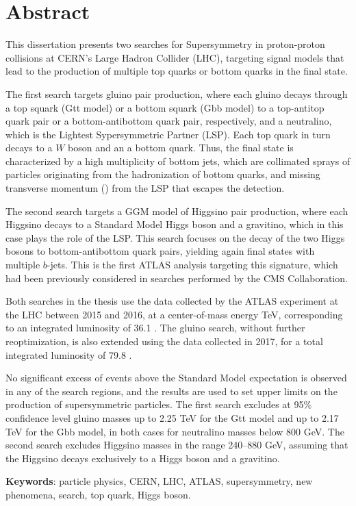 \chapter*{Abstract}

This dissertation presents two searches for Supersymmetry in proton-proton collisions at CERN's Large Hadron Collider (LHC), 
targeting signal models that lead to the production of multiple top quarks or bottom quarks in the final state.

The first search targets gluino pair production, where each gluino decays through a top squark (Gtt model) or a bottom squark (Gbb model) 
to a top-antitop quark pair or a bottom-antibottom quark pair, respectively, and a neutralino, which is the Lightest Sypersymmetric Partner (LSP).
Each top quark in turn decays to a $W$ boson and an a bottom quark.
Thus, the final state is characterized by a high multiplicity of bottom jets, which are collimated sprays of particles originating from the hadronization of bottom quarks, and 
missing transverse momentum (\met) from the LSP that escapes the detection. 

The second search targets a GGM model of Higgsino pair production, 
where each Higgsino decays to a Standard Model Higgs boson and 
a gravitino, which in this case plays the role of the LSP. 
This search focuses on the decay of the two Higgs bosons to bottom-antibottom quark pairs, yielding again final states with multiple $b$-jets.
This is the first ATLAS analysis targeting this signature, which had been 
previously considered in searches performed by the CMS Collaboration.

Both searches in the thesis use the data collected by the ATLAS experiment at the LHC 
between 2015 and 2016, at a center-of-mass energy  \cmtre TeV,
corresponding to an integrated luminosity of 36.1 \ifb.
The gluino search, without further reoptimization, is also extended using the data collected in 2017, for a total integrated luminosity of 79.8 \ifb.

No significant excess of events above the Standard Model expectation is observed in any of the search regions, 
and the results are used to set upper limits on the production of supersymmetric particles. 
The first search excludes at 95\% confidence level gluino masses up to 2.25 TeV for the Gtt model 
and up to 2.17 TeV for the Gbb model, in both cases for neutralino masses below 800 GeV.
The second search excludes Higgsino masses in the range 240--880 GeV, assuming 
that the Higgsino decays exclusively to a Higgs boson and a gravitino. 

\par\bigskip
\par\bigskip 
\par\bigskip

\noindent \textbf{Keywords}: particle physics, CERN, LHC, ATLAS, supersymmetry, new phenomena, search, top quark, Higgs boson. 
